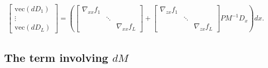 \documentclass{article}
\begin{document}
\begin{align}
  \begin{bmatrix}
    \mathrm{vec}\left(dD_1\right) \\
    \vdots                        \\
    \mathrm{vec}\left(dD_L\right)
  \end{bmatrix}
  =
  \left(
  \begin{bmatrix}
    \nabla_{xx} f_1 &        &                 \\
                    & \ddots &                 \\
                    &        & \nabla_{xx} f_L
  \end{bmatrix}
  +
  \begin{bmatrix}
    \nabla_{zx} f_1 \\ &\ddots& \\ &&\nabla_{zx} f_L
  \end{bmatrix}
  P M^{-1} D_x
  \right)dx.
\end{align}

\subsection{The term involving $dM$}
\end{document}

